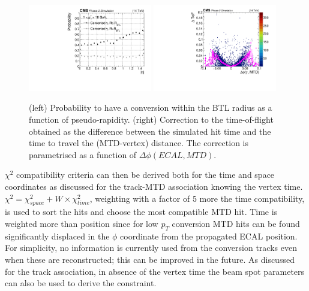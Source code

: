 \begin{figure}[!hbtp]
\centering
\includegraphics[width=0.48\textwidth]{fig/performance/neutrals/neutrals_efficiency_vs_eta_breakdown.pdf}
\includegraphics[width=0.48\textwidth]{fig/performance/neutrals/delta_tof_vs_dPhi.pdf}
\caption{(left) Probability to have a conversion within the BTL radius as a function of pseudo-rapidity. (right) Correction to the time-of-flight obtained as the difference between the simulated hit time and the time to travel the (MTD-vertex) distance. The correction is parametrised as a function of $\Delta\phi(ECAL,MTD)$.}
\label{fig:neutrals_mustache}
\end{figure}

$\chi^{2}$ compatibility criteria can then be derived both for the time and space coordinates as discussed for the track-MTD association knowing the vertex time.  $\chi^2=\chi^2_{space}+W\times\chi^2_{time}$, weighting with a factor of 5 more the time compatibility, is used to sort the hits and choose the most compatible MTD hit. Time is weighted more than position since for low $p_{T}$ conversion MTD hits can be found significantly displaced in the $\phi$ coordinate from the propagated ECAL position. For simplicity, no information is currently used from the conversion tracks even when these are reconstructed; this can be improved in the future. As discussed for the track association, in absence of the vertex time the beam spot parameters can also be used to derive the constraint.



